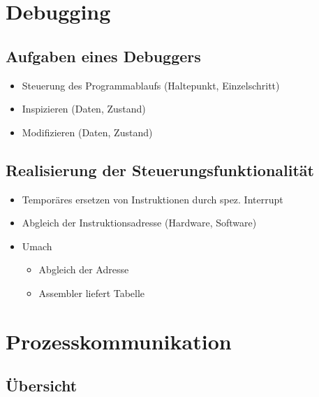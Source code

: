 \section{Debugging}

\subsection{Aufgaben eines Debuggers}

\begin{frame}{\insertsubsection}
    \begin{itemize}
         \item Steuerung des Programmablaufs (Haltepunkt, Einzelschritt)
         \item Inspizieren (Daten, Zustand)
         \item Modifizieren (Daten, Zustand)
    \end{itemize}
\end{frame}

\subsection{Realisierung der Steuerungsfunktionalität}

\begin{frame}{\insertsubsection}
    \begin{itemize}
         \item Temporäres ersetzen von Instruktionen durch spez. Interrupt
         \item Abgleich der Instruktionsadresse (Hardware, Software)
         \item Umach
         \begin{itemize}
             \item Abgleich der Adresse
             \item Assembler liefert Tabelle
         \end{itemize}     
    \end{itemize}
\end{frame}

\section{Prozesskommunikation}

\subsection{Übersicht}

